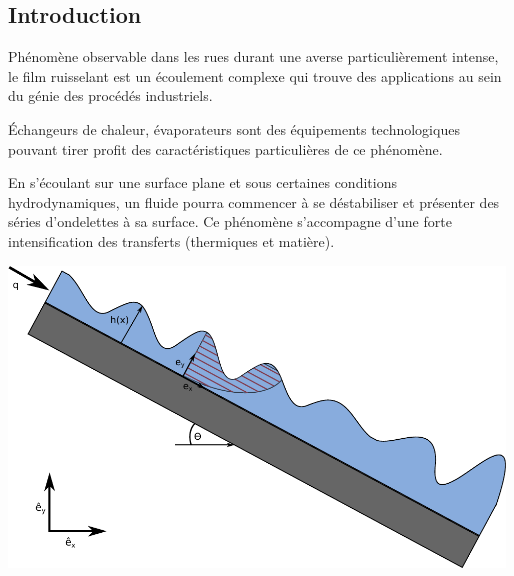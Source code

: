 \documentclass[a0,portrait]{a0poster}
\begin{document}
\begin{multicols}{2}
    \setlength{\columnseprule}{0pt}

    \section*{Introduction}

    Phénomène observable dans les rues durant une averse particulièrement intense, le film ruisselant est un écoulement complexe qui trouve des applications au sein du génie des procédés industriels.

    Échangeurs de chaleur, évaporateurs sont des équipements technologiques pouvant tirer profit des caractéristiques particulières de ce phénomène.

    En s'écoulant sur une surface plane et sous certaines conditions hydrodynamiques, un fluide pourra commencer à se déstabiliser et présenter des séries d'ondelettes à sa surface. Ce phénomène s'accompagne d'une forte intensification des transferts (thermiques et matière).

    \begin{multicols}{2}
        \begin{center}\vspace{.2cm}
        \end{center}\vspace{.2cm}
        \columnbreak
        \begin{center}\vspace{.2cm}
            \includegraphics[height=8cm]{thinfilm_unstable}
        \end{center}\vspace{.2cm}
    \end{multicols}


\end{multicols}
\end{document}
